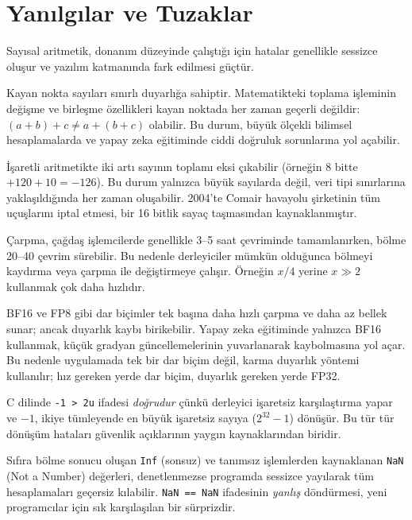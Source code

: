 \section{Yanılgılar ve Tuzaklar}
\label{sec:aritmetik-yanilgilar}

Sayısal aritmetik, donanım düzeyinde çalıştığı için hatalar genellikle sessizce oluşur ve yazılım katmanında fark edilmesi güçtür.

Kayan nokta sayıları sınırlı duyarlığa sahiptir. Matematikteki toplama işleminin değişme ve birleşme özellikleri kayan noktada her zaman geçerli değildir: $(a + b) + c \neq a + (b + c)$ olabilir. Bu durum, büyük ölçekli bilimsel hesaplamalarda ve yapay zeka eğitiminde ciddi doğruluk sorunlarına yol açabilir.

İşaretli aritmetikte iki artı sayının toplamı eksi çıkabilir (örneğin 8 bitte $+120 + 10 = -126$). Bu durum yalnızca büyük sayılarda değil, veri tipi sınırlarına yaklaşıldığında her zaman oluşabilir. 2004'te Comair havayolu şirketinin tüm uçuşlarını iptal etmesi, bir 16 bitlik sayaç taşmasından kaynaklanmıştır.

Çarpma, çağdaş işlemcilerde genellikle 3--5 saat çevriminde tamamlanırken, bölme 20--40 çevrim sürebilir. Bu nedenle derleyiciler mümkün olduğunca bölmeyi kaydırma veya çarpma ile değiştirmeye çalışır. Örneğin $x / 4$ yerine $x \gg 2$ kullanmak çok daha hızlıdır.

BF16 ve FP8 gibi dar biçimler tek başına daha hızlı çarpma ve daha az bellek sunar; ancak duyarlık kaybı birikebilir. Yapay zeka eğitiminde yalnızca BF16 kullanmak, küçük gradyan güncellemelerinin yuvarlanarak kaybolmasına yol açar. Bu nedenle uygulamada tek bir dar biçim değil, karma duyarlık yöntemi kullanılır; hız gereken yerde dar biçim, duyarlık gereken yerde FP32.

C dilinde \texttt{-1 > 2u} ifadesi \emph{doğrudur} çünkü derleyici işaretsiz karşılaştırma yapar ve $-1$, ikiye tümleyende en büyük işaretsiz sayıya ($2^{32}-1$) dönüşür. Bu tür tür dönüşüm hataları güvenlik açıklarının yaygın kaynaklarından biridir.

Sıfıra bölme sonucu oluşan \texttt{Inf} (sonsuz) ve tanımsız işlemlerden kaynaklanan \texttt{NaN} (Not a Number) değerleri, denetlenmezse programda sessizce yayılarak tüm hesaplamaları geçersiz kılabilir. \texttt{NaN == NaN} ifadesinin \emph{yanlış} döndürmesi, yeni programcılar için sık karşılaşılan bir sürprizdir.

